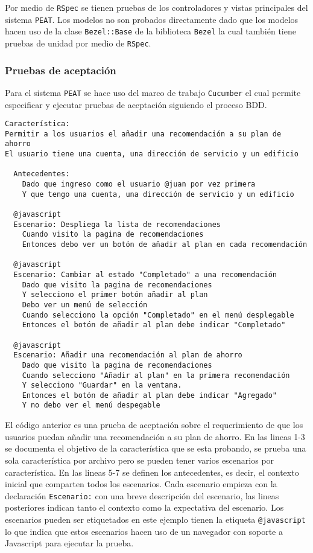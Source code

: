 Por medio de \texttt{RSpec} se tienen pruebas de los controladores y vistas
principales del sistema \texttt{PEAT}. Los modelos no son probados directamente
dado que los modelos hacen uso de la clase \texttt{Bezel::Base} de la biblioteca
\texttt{Bezel} la cual también tiene pruebas de unidad por medio de \texttt{RSpec}.

\subsubsection{Pruebas de aceptación}

Para el sistema \texttt{PEAT} se hace uso del marco de trabajo \texttt{Cucumber}
el cual permite especificar y ejecutar pruebas de aceptación siguiendo el proceso
BDD.

\begin{lstlisting}
Característica:
Permitir a los usuarios el añadir una recomendación a su plan de ahorro
El usuario tiene una cuenta, una dirección de servicio y un edificio

  Antecedentes:
    Dado que ingreso como el usuario @juan por vez primera
    Y que tengo una cuenta, una dirección de servicio y un edificio

  @javascript
  Escenario: Despliega la lista de recomendaciones
    Cuando visito la pagina de recomendaciones
    Entonces debo ver un botón de añadir al plan en cada recomendación

  @javascript
  Escenario: Cambiar al estado "Completado" a una recomendación
    Dado que visito la pagina de recomendaciones
    Y selecciono el primer botón añadir al plan
    Debo ver un menú de selección
    Cuando selecciono la opción "Completado" en el menú desplegable
    Entonces el botón de añadir al plan debe indicar "Completado"

  @javascript
  Escenario: Añadir una recomendación al plan de ahorro
    Dado que visito la pagina de recomendaciones
    Cuando selecciono "Añadir al plan" en la primera recomendación
    Y selecciono "Guardar" en la ventana.
    Entonces el botón de añadir al plan debe indicar "Agregado"
    Y no debo ver el menú despegable
\end{lstlisting}

El código anterior es una prueba de aceptación sobre el requerimiento de que los
usuarios puedan añadir una recomendación a su plan de ahorro.
En las lineas 1-3 se documenta el objetivo de la característica que se esta
probando, se prueba una sola característica por archivo pero se pueden tener
varios escenarios por característica. En las lineas 5-7 se definen
los antecedentes, es decir, el contexto inicial que comparten todos los
escenarios. Cada escenario empieza con la declaración \texttt{Escenario:}
con una breve descripción del escenario, las lineas posteriores indican
tanto el contexto como la expectativa del escenario. Los escenarios
pueden ser etiquetados en este ejemplo tienen la etiqueta \texttt{@javascript}
lo que indica que estos escenarios hacen uso de un navegador con soporte
a Javascript para ejecutar la prueba.

